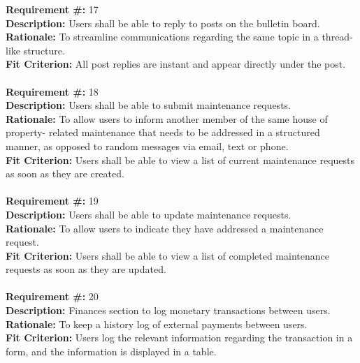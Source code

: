 \documentclass[12pt]{article}
\begin{document}
      \textbf{Requirement \#:} 17
       \\
      \textbf{Description:} Users shall be able to reply to posts on the bulletin board. \\
      \textbf{Rationale:} To streamline communications regarding the same topic in a thread-like structure. \\
      \textbf{Fit Criterion:} All post replies are instant and appear directly under the post.  \\ \\ 
\textbf{Requirement \#:} 18
       \\
      \textbf{Description:} Users shall be able to submit maintenance
      requests. \\
      \textbf{Rationale:} To allow users to inform another member of the same house of property-
      related maintenance that needs to be addressed in a structured manner, as opposed to random messages via email, text or phone.\\
      \textbf{Fit Criterion:} Users shall be able to view a list of current
      maintenance requests as soon as they are created.\\ \\    
\textbf{Requirement \#:} 19
       \\
      \textbf{Description:} Users shall be able to update maintenance
      requests. \\
      \textbf{Rationale:} To allow users to indicate they have addressed a maintenance request. \\
      \textbf{Fit Criterion:} Users shall be able to view a list of completed
      maintenance requests as soon as they are updated.\\ \\                 
\textbf{Requirement \#:} 20
       \\
      \textbf{Description: }{Finances section to log monetary transactions between users.} \\
      \textbf{Rationale: }{To keep a history log of external payments between users.} \\
      \textbf{Fit Criterion: }{Users log the relevant information regarding the transaction in a form, and the information is displayed in a table.} \\ \\        
\end{document}
